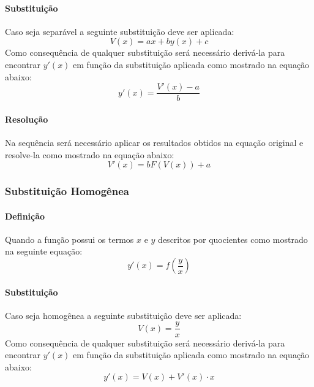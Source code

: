 \documentclass{article}
\begin{document}
                \paragraph{Substituição}Caso seja separável a seguinte substituição deve ser aplicada:
                    \begin{equation*}
                        \boxed{
                            V(x) = ax+by(x)+c
                        }
                    \end{equation*}
                Como consequência de qualquer substituição será necessário derivá-la para encontrar $y'(x)$ em função da substituição aplicada como mostrado na equação abaixo:
                    \begin{equation*}
                        y'(x)=\frac{V'(x)-a}{b}
                    \end{equation*}
                \paragraph{Resolução}Na sequência será necessário aplicar os resultados obtidos na equação original e resolve-la como mostrado na equação abaixo:
                    \begin{equation}
                        \boxed{
                            V'(x)=bF(V(x))+a
                        }
                    \end{equation}

            \subsubsection{Substituição Homogênea}
                \paragraph{Definição}Quando a função possui os termos $x$ e $y$ descritos por quocientes como mostrado na seguinte equação:
                    \begin{equation*}
                        y'(x)=f(\frac{y}{x})
                    \end{equation*}
                \paragraph{Substituição}Caso seja homogênea a seguinte substituição deve ser aplicada:
                    \begin{equation}
                        \boxed{
                            V(x)=\frac{y}{x}
                        }
                    \end{equation}
                Como consequência de qualquer substituição será necessário derivá-la para encontrar $y'(x)$ em função da substituição aplicada como mostrado na equação abaixo:
                    \begin{equation*}
                        y'(x)=V(x)+V'(x) \cdot x
                    \end{equation*}
\end{document}
